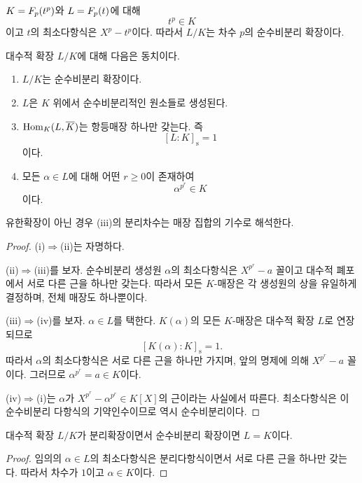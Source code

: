 \begin{example}
$K=F_p(t^p)$와 $L=F_p(t)$에 대해
\[
  t^p\in K
\]
이고 $t$의 최소다항식은 $X^p-t^p$이다. 따라서 $L/K$는 차수 $p$의 순수비분리 확장이다.
\end{example}

\begin{theorem}
대수적 확장 $L/K$에 대해 다음은 동치이다.
\begin{enumerate}[label=(\roman*)]
  \item $L/K$는 순수비분리 확장이다.
  \item $L$은 $K$ 위에서 순수비분리적인 원소들로 생성된다.
  \item $\operatorname{Hom}_K(L,\overline K)$는 항등매장 하나만 갖는다. 즉
  \[
    [L:K]_{\mathrm s}=1
  \]
  이다.
  \item 모든 $\alpha\in L$에 대해 어떤 $r\ge0$이 존재하여
  \[
    \alpha^{p^r}\in K
  \]
  이다.
\end{enumerate}
유한확장이 아닌 경우 (iii)의 분리차수는 매장 집합의 기수로 해석한다.
\end{theorem}

\begin{proof}
(i)$\Rightarrow$(ii)는 자명하다.

(ii)$\Rightarrow$(iii)를 보자. 순수비분리 생성원 $\alpha$의 최소다항식은 $X^{p^r}-a$ 꼴이고 대수적 폐포에서 서로 다른 근을 하나만 갖는다. 따라서 모든 $K$-매장은 각 생성원의 상을 유일하게 결정하며, 전체 매장도 하나뿐이다.

(iii)$\Rightarrow$(iv)를 보자. $\alpha\in L$를 택한다. $K(\alpha)$의 모든 $K$-매장은 대수적 확장 $L$로 연장되므로
\[
  [K(\alpha):K]_{\mathrm s}=1.
\]
따라서 $\alpha$의 최소다항식은 서로 다른 근을 하나만 가지며, 앞의 명제에 의해 $X^{p^r}-a$ 꼴이다. 그러므로 $\alpha^{p^r}=a\in K$이다.

(iv)$\Rightarrow$(i)는 $\alpha$가 $X^{p^r}-\alpha^{p^r}\in K[X]$의 근이라는 사실에서 따른다. 최소다항식은 이 순수비분리 다항식의 기약인수이므로 역시 순수비분리이다.
\end{proof}

\begin{corollary}
대수적 확장 $L/K$가 분리확장이면서 순수비분리 확장이면 $L=K$이다.
\end{corollary}

\begin{proof}
임의의 $\alpha\in L$의 최소다항식은 분리다항식이면서 서로 다른 근을 하나만 갖는다. 따라서 차수가 $1$이고 $\alpha\in K$이다.
\end{proof}

